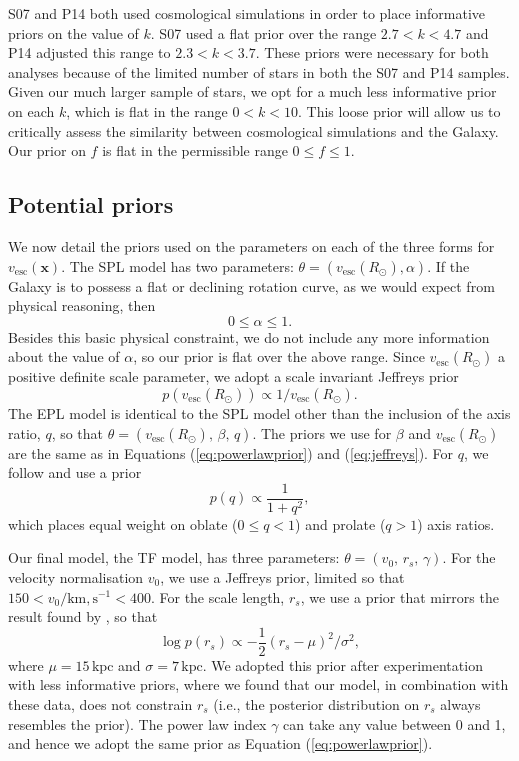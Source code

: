\documentclass[useAMS,twocolumn,usenatbib]{mn2e}
\def\kpc{{\,\mathrm{kpc}}}
\def\vesc{{v_\mathrm{esc}}}
\def\pos{{\boldsymbol{x}}}
\begin{document}
S07 and P14 both used cosmological simulations in order to place informative priors on the value of $k$. 
S07 used a flat prior over the range $2.7 < k < 4.7$ and P14 adjusted this range to $2.3 < k < 3.7$. 
These priors were necessary for both analyses because of the limited number of stars in both the S07 and P14 samples. 
Given our much larger sample of stars, we opt for a much less informative prior on each $k$, which is flat in the range $0 < k < 10$. 
This loose prior will allow us to critically assess the similarity between cosmological simulations and the Galaxy. 
Our prior on $f$ is flat in the permissible range $0 \leq f \leq 1$.

\subsection{Potential priors}

We now detail the priors used on the parameters on each of the three forms for $\vesc(\pos)$.
The SPL model has two parameters: $\theta = (\vesc(R_\odot),\alpha)$. 
If the Galaxy is to possess a flat or declining rotation curve, as we would expect from physical reasoning, then
%
\begin{equation}
0 \leq \alpha \leq 1.
\label{eq:powerlawprior}
\end{equation}
%
Besides this basic physical constraint, we do not include any more information about the value of $\alpha$, so our prior is flat over the above range. 
Since $\vesc(R_\odot)$ a positive definite scale parameter, we adopt a scale invariant Jeffreys prior
%
\begin{equation}
p\left(\vesc(R_\odot)\right) \propto 1/\vesc(R_\odot).
\label{eq:jeffreys}
\end{equation}
%
The EPL model is identical to the SPL model other than the inclusion of the axis ratio, $q$, so that $\theta = (\vesc(R_\odot),\,\beta,\,q)$. 
The priors we use for $\beta$ and $\vesc(R_\odot)$ are the same as in Equations (\ref{eq:powerlawprior}) and (\ref{eq:jeffreys}). For $q$, we follow \citet{Bo16} and use a prior
%
\begin{equation}
p(q) \propto \dfrac{1}{1+q^2},
\end{equation}
%
which places equal weight on oblate ($0\leq q <1$) and prolate ($q>1$) axis ratios.

Our final model, the TF model, has three parameters: $\theta = (v_0,\,r_s,\,\gamma)$. 
For the velocity normalisation $v_0$, we use a Jeffreys prior, limited so that $150 < v_0/\mathrm{km,s^{-1}} < 400$. 
For the scale length, $r_s$, we use a prior that mirrors the result found by \citet{Gi14}, so that
%
\begin{equation}
\log p(r_s) \propto -\dfrac{1}{2}(r_s - \mu)^2 / \sigma^2,
\end{equation}
% 
where $\mu=15\kpc$ and $\sigma=7\kpc$. 
We adopted this prior after experimentation with less informative priors, where we found that our model, in combination with these data, does not constrain $r_s$ (i.e., the posterior distribution on $r_s$ always resembles the prior).
The power law index $\gamma$ can take any value between 0 and 1, and hence we adopt the same prior as Equation (\ref{eq:powerlawprior}).
\end{document}
